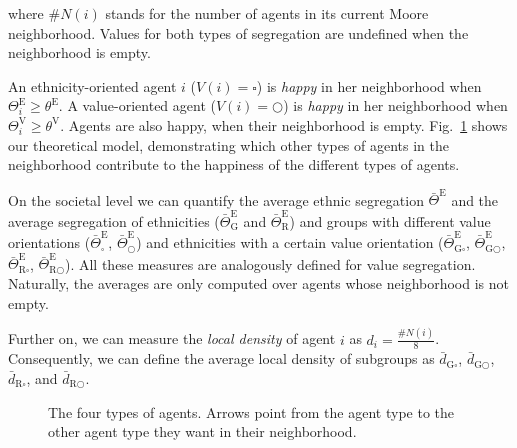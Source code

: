 \documentclass{ws-acs}
\begin{document}
where $\#N(i)$ stands for the number of agents in its current Moore neighborhood. Values for both types of segregation are undefined when the neighborhood is empty. 

An ethnicity-oriented agent $i$ ($V(i)=\square$) is {\it happy} in her neighborhood when $\Theta^\text{E}_i \geq \theta^\text{E}$.    
A value-oriented agent ($V(i)=\bigcirc$) is {\it happy} in her neighborhood when $\Theta^\text{V}_i \geq \theta^\text{V}$.     
Agents are also happy, when their neighborhood is empty. Fig.~\ref{fig:model} shows our theoretical model, demonstrating which other types of agents in the neighborhood contribute to the happiness of the different types of agents. 

On the societal level we can quantify the average ethnic segregation $\bar\Theta^\text{E}$ and the average segregation of ethnicities ($\bar\Theta^\text{E}_{\text{G}}$ and $\bar\Theta^\text{E}_{\text{R}}$) and groups with different value orientations ($\bar\Theta^\text{E}_{\square}$, $\bar\Theta^\text{E}_{\bigcirc}$) and ethnicities with a certain value orientation ($\bar\Theta^\text{E}_{\text{G}\square}$, $\bar\Theta^\text{E}_{\text{G}\bigcirc}$, $\bar\Theta^\text{E}_{\text{R}\square}$, $\bar\Theta^\text{E}_{\text{R}\bigcirc}$). All these measures are analogously defined for value segregation. Naturally, the averages are only computed over agents whose neighborhood is not empty.

Further on, we can measure the {\it local density} of agent $i$ as $d_i = \frac{\#N(i)}{8}$. Consequently, we can define the average local density of subgroups as $\bar d_{\text{G}\square}$, $\bar d_{\text{G}\bigcirc}$, $\bar d_{\text{R}\square}$, and $\bar d_{\text{R}\bigcirc}$. 

\begin{figure}[th]
\centerline{}
\vspace*{8pt}
\caption{The four types of agents. Arrows point from the agent type to the other agent type they want in their neighborhood.}
\label{fig:model}
\end{figure}
\end{document}
